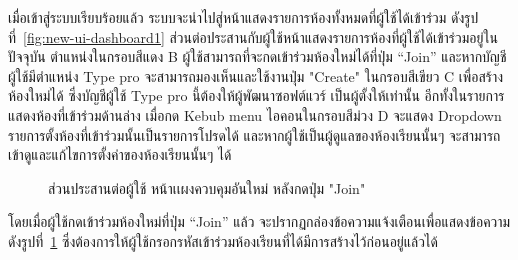\documentclass[12pt,one side,openright,a4paper]{cpe-thesis-th}
\newcommand{\thaijustify}[1]{%
  \par\hspace{30pt}\justifying
  #1
}
\begin{document}
                \thaijustify{
                    เมื่อเข้าสู่ระบบเรียบร้อยแล้ว ระบบจะนำไปสู่หน้าแสดงรายการห้องทั้งหมดที่ผู้ใช้ได้เข้าร่วม ดังรูปที่~\ref{fig:new-ui-dashboard1} ส่วนต่อประสานกับผู้ใช้หน้าแสดงรายการห้องที่ผู้ใช้ได้เข้าร่วมอยู่ในปัจจุบัน ตำแหน่งในกรอบสีแดง B ผู้ใช้สามารถที่จะกดเข้าร่วมห้องใหม่ได้ที่ปุ่ม “Join” และหากบัญชีผู้ใช้มีตำแหน่ง Type pro จะสามารถมองเห็นและใช้งานปุ่ม "Create" ในกรอบสีเขียว C เพื่อสร้างห้องใหม่ได้ ซึ่งบัญชีผู้ใช้ Type pro นี้ต้องให้ผู้พัฒนาซอฟต์แวร์ เป็นผู้ตั้งให้เท่านั้น อีกทั้งในรายการแสดงห้องที่เข้าร่วมด้านล่าง เมื่อกด Kebub menu ไอคอนในกรอบสีม่วง D จะแสดง Dropdown รายการตั้งห้องที่เข้าร่วมนั้นเป็นรายการโปรดได้ และหากผู้ใช้เป็นผู้ดูแลของห้องเรียนนั้นๆ จะสามารถเข้าดูและแก้ไขการตั้งค่าของห้องเรียนนั้นๆ ได้
                }
                \begin{figure}[H]
                    \centering
                    \caption[ส่วนประสานต่อผู้ใช้ หน้าเเผงควบคุมอันใหม่ (กดปุ่ม "Join")]{ส่วนประสานต่อผู้ใช้ หน้าเเผงควบคุมอันใหม่ หลังกดปุ่ม "Join"}\label{fig:new-ui-dashboard2}
                \end{figure}
                \thaijustify{
                    โดยเมื่อผู้ใช้กดเข้าร่วมห้องใหม่ที่ปุ่ม “Join” แล้ว จะปรากฏกล่องข้อความแจ้งเตือนเพื่อแสดงข้อความ ดังรูปที่~\ref{fig:new-ui-dashboard2} ซึ่งต้องการให้ผู้ใช้กรอกรหัสเข้าร่วมห้องเรียนที่ได้มีการสร้างไว้ก่อนอยู่แล้วได้ 
                }
        
\end{document}
